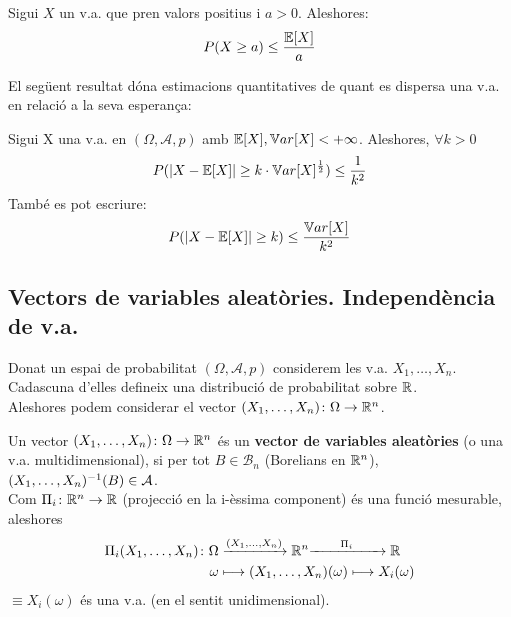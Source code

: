 \begin{thm}
  Sigui $X$ un v.a. que pren valors positius i $a > 0$. Aleshores: \\
  \[
    P(X \geq a) \leq \frac{\mathbb{E}[X]}{a}
  \]
\end{thm}

El següent resultat dóna estimacions quantitatives de quant es dispersa una v.a. en relació a la seva esperança:

\begin{thm}
  Sigui X una v.a. en $(\Omega, \mathcal{A}, p)$ amb $\mathbb{E}[X], \mathbb{V} ar[X] < +\infty$. Aleshores, $\forall k > 0$
  \[
    P(\left\vert X-\mathbb{E}[X] \right\vert\geq k\cdot \mathbb{V} ar[X]^{\frac{1}{2}}) \leq \frac{1}{k^{2}}
  \]
  També es pot escriure:
  \[
    P(\left\vert X-\mathbb{E}[X] \right\vert\geq k) \leq \frac{\mathbb{V} ar[X]}{k^{2}}
  \]
\end{thm}

\subsection{Vectors de variables aleatòries. Independència de v.a.}

Donat un espai de probabilitat $(\Omega, \mathcal{A}, p)$ considerem les v.a. $X_{1}, \ldots, X_{n}$.  
Cadascuna d'elles defineix una distribució de probabilitat sobre $\mathbb{R}$. \\
Aleshores podem considerar el vector $(X_{1}, \ldots, X_{n})\colon \Omega \to \mathbb{R}^{n}$. 

\begin{defi}
  Un vector $(X_{1}, \ldots, X_{n})\colon \Omega \to \mathbb{R}^{n}$ és un \textbf{vector de variables aleatòries} 
  (o una v.a. multidimensional), si per tot $B \in \mathcal{B}_{n}$ (Borelians en $\mathbb{R}^{n}$), $(X_{1}, \ldots, X_{n})^{-1}(B) \in \mathcal{A}$. \\
  
  Com $\Pi_{i}\colon \mathbb{R}^{n} \to \mathbb{R}$ (projecció en la i-èssima component) és una funció mesurable, aleshores 
  \[
  \begin{aligned}
      \Pi_{i}(X_{1}, \ldots, X_{n}) \colon \Omega &\xrightarrow{(X_{1}, \ldots, X_{n})} \real^{n} \hspace{-0.1cm} 
      \xrightarrow{\qquad \Pi_{i} \qquad} \real \\
      \omega &\longmapsto (X_{1}, \ldots, X_{n})(\omega) \longmapsto X_{i}(\omega)
  \end{aligned}
  \]
  $\equiv X_{i}(\omega)$ és una v.a. (en el sentit unidimensional).
\end{defi}

